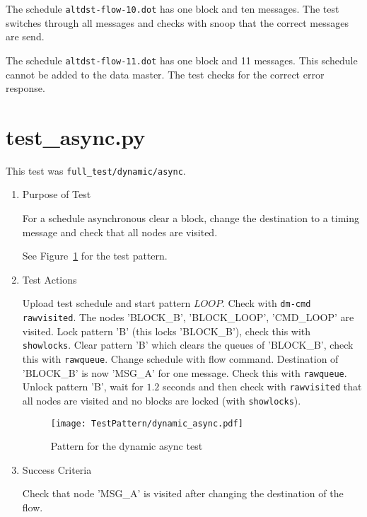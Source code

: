 \documentclass[12pt,a4paper]{report}
\begin{document}
The schedule \texttt{altdst-flow-10.dot} has one block and ten messages.
The test switches through all messages and checks with snoop that the
correct messages are send.

The schedule \texttt{altdst-flow-11.dot} has one block and 11 messages.
This schedule cannot be added to the data master. The test checks for 
the correct error response.

\section{test\_async.py}
This test was \texttt{full\_test/dynamic/async}.
\begin{enumerate}
	\item Purpose of Test

	For a schedule asynchronous clear a block, change the destination to 
  a timing message and check that all nodes are visited.

	See Figure~\ref{fig:Pattern_for_the_dynamic_async_test} for the test pattern.
	\item Test Actions

	Upload test schedule and start pattern $LOOP$. Check with \texttt{dm-cmd rawvisited}. The
	nodes 'BLOCK\_B', 'BLOCK\_LOOP', 'CMD\_LOOP' are visited. Lock pattern 'B' (this locks 'BLOCK\_B'), check this with
	\texttt{showlocks}. Clear pattern 'B' which clears the queues of 'BLOCK\_B', check this with \texttt{rawqueue}.
	Change schedule with flow command. Destination of 'BLOCK\_B' is now 'MSG\_A' for one message. Check this
	with \texttt{rawqueue}. Unlock pattern 'B', wait for $1.2$ seconds and then check with \texttt{rawvisited} that all
	nodes are visited and no blocks are locked (with \texttt{showlocks}).
    \begin{figure}
        \centering
        \texttt{[image: TestPattern/dynamic\_async.pdf]}
        \caption{Pattern for the dynamic async test}
        \label{fig:Pattern_for_the_dynamic_async_test}
    \end{figure}
	\item Success Criteria

	Check that node 'MSG\_A' is visited after changing the destination of the flow.
\end{enumerate}
\end{document}
